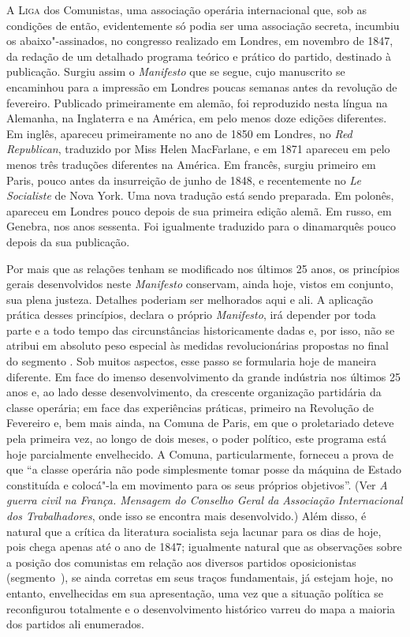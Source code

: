 
\textsc{A Liga} dos Comunistas, uma associação operária internacional que, sob as
condições de então, evidentemente só podia ser uma associação secreta,
incumbiu os abaixo"-assinados, no congresso realizado em Londres, em
novembro de 1847, da redação de um detalhado programa teórico e prático
do partido, destinado à publicação. Surgiu assim o \textit{Manifesto}
que se segue, cujo manuscrito se encaminhou para a impressão em Londres
poucas semanas antes da revolução de fevereiro. Publicado primeiramente
em alemão, foi reproduzido nesta língua na Alemanha, na Inglaterra e na
América, em pelo menos doze edições diferentes. Em inglês, apareceu
primeiramente no ano de 1850 em Londres, no \textit{Red Republican},
traduzido por Miss Helen MacFarlane, e em 1871 apareceu em pelo menos
três traduções diferentes na América. Em francês, surgiu primeiro em
Paris, pouco antes da insurreição de junho de 1848, e recentemente no
\textit{Le Socialiste} de Nova York. Uma nova tradução está sendo
preparada. Em polonês, apareceu em Londres pouco depois de sua primeira
edição alemã. Em russo, em Genebra, nos anos sessenta. Foi igualmente
traduzido para o dinamarquês pouco depois da sua publicação.

Por mais que as relações tenham se modificado nos últimos 25
anos, os princípios gerais desenvolvidos neste \textit{Manifesto}
conservam, ainda hoje, vistos em conjunto, sua plena justeza. Detalhes
poderiam ser melhorados aqui e ali. A aplicação prática desses
princípios, declara o próprio \textit{Manifesto}, irá depender por toda
parte e a todo tempo das circunstâncias historicamente dadas e, por
isso, não se atribui em absoluto peso especial às medidas
revolucionárias propostas no final do segmento . Sob muitos aspectos,
esse passo se formularia hoje de maneira diferente. Em face do imenso
desenvolvimento da grande indústria nos últimos 25 anos e,
ao lado desse desenvolvimento, da crescente organização partidária da
classe operária; em face das experiências práticas, primeiro na
Revolução de Fevereiro e, bem mais ainda, na Comuna de Paris, em que o
proletariado deteve pela primeira vez, ao longo de dois meses, o poder
político, este programa está hoje parcialmente envelhecido. A Comuna,
particularmente, forneceu a prova de que “a classe operária não pode
simplesmente tomar posse da máquina de Estado constituída e colocá"-la
em movimento para os seus próprios objetivos”. (Ver \textit{A guerra
civil na França. Mensagem do Conselho Geral da Associação Internacional
dos Trabalhadores}, onde isso se encontra mais
desenvolvido.) Além disso, é natural que a crítica da literatura
socialista seja lacunar para os dias de hoje, pois chega apenas até o
ano de 1847; igualmente natural que as observações sobre a posição dos
comunistas em relação aos diversos partidos oposicionistas (\mbox{segmento }),
se ainda corretas em seus traços fundamentais, já estejam hoje, no entanto, envelhecidas em sua apresentação, uma vez que a situação
política se reconfigurou totalmente e o desenvolvimento histórico
varreu do mapa a maioria dos partidos ali enumerados.

